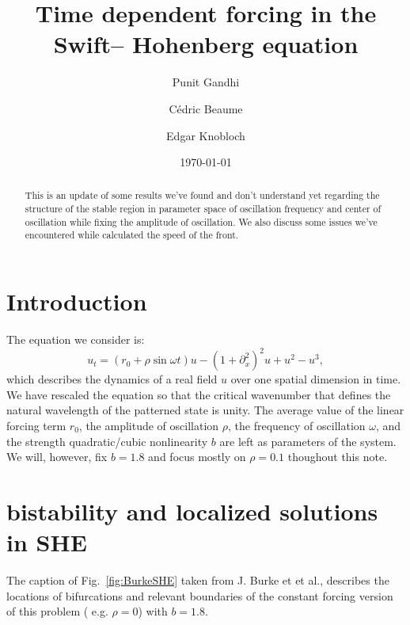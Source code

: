 \documentclass[pre,preprint,superscriptaddress]{revtex4-1}
\begin{document}
\title{Time dependent forcing in the Swift-- Hohenberg equation}
\author{Punit Gandhi}
\author{C\'edric Beaume}
\author{Edgar Knobloch}
\date{\today}

\begin{abstract}
This is an update of some results we've found and don't understand yet regarding the structure of the stable region in parameter space of oscillation frequency and center of oscillation while fixing the amplitude of oscillation.  We also discuss some issues we've encountered while calculated the speed of the front.
\end{abstract}

\maketitle

\section{Introduction}
The equation we consider is: 
\begin{equation}
u_t= (r_0+ \rho \sin\omega t) u-\left(1+\partial_{x}^2\right)^2u+u^2-u^3\label{eq:SH},
\end{equation}
which describes the dynamics of a real field $u$ over one spatial dimension in time.  We have rescaled the equation so that the critical wavenumber that defines the natural wavelength of the patterned state is unity.   The average value of the linear forcing term $r_0$, the amplitude of oscillation $\rho$, the frequency of oscillation $\omega$, and the strength quadratic/cubic nonlinearity $b$ are left as parameters of the system.  We will, however, fix $b=1.8$ and focus mostly on $\rho =0.1$ thoughout this note.    

\section{bistability and localized solutions in SHE}
The caption of Fig.~\ref{fig:BurkeSHE}  taken from J. Burke et et al., describes the locations of bifurcations and relevant boundaries of the constant forcing version of this problem ( e.g. $\rho=0$) with $b=1.8$.  
\end{document}
